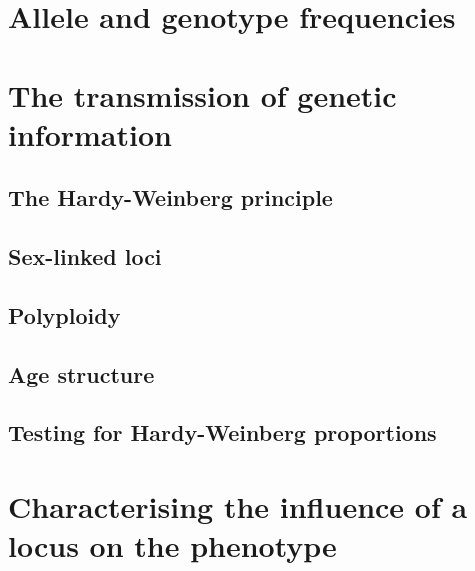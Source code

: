 \documentclass[
]{book}
\begin{document}
\hypertarget{allele-and-genotype-frequencies}{%
\section{Allele and genotype frequencies}\label{allele-and-genotype-frequencies}}

\hypertarget{the-transmission-of-genetic-information}{%
\section{The transmission of genetic information}\label{the-transmission-of-genetic-information}}

\hypertarget{the-hardy-weinberg-principle}{%
\subsection{The Hardy-Weinberg principle}\label{the-hardy-weinberg-principle}}

\hypertarget{sex-linked-loci}{%
\subsection{Sex-linked loci}\label{sex-linked-loci}}

\hypertarget{polyploidy}{%
\subsection{Polyploidy}\label{polyploidy}}

\hypertarget{age-structure}{%
\subsection{Age structure}\label{age-structure}}

\hypertarget{testing-for-hardy-weinberg-proportions}{%
\subsection{Testing for Hardy-Weinberg proportions}\label{testing-for-hardy-weinberg-proportions}}

\hypertarget{characterising-the-influence-of-a-locus-on-the-phenotype}{%
\section{Characterising the influence of a locus on the phenotype}\label{characterising-the-influence-of-a-locus-on-the-phenotype}}
\end{document}
